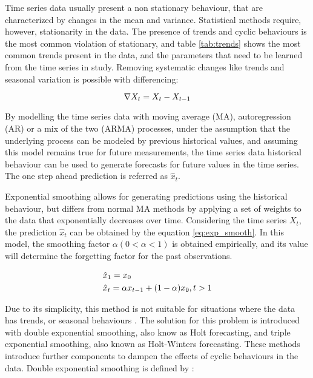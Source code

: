 \par Time series data usually present a non stationary behaviour, that are characterized by changes in the mean and variance. Statistical methods require, however, stationarity in the data. The presence of trends and cyclic behaviours
is the most common violation of stationary, and table \ref{tab:trends} shows the most common trends present in the data, and the parameters that need to be learned from the time series in study. Removing systematic changes like trends
and seasonal variation is possible with differencing:

\begin {equation*}
\centering
\nabla X_t = X_t - X_{t-1}
\end {equation*}

\par By modelling the time series data with moving average (MA), autoregression (AR) or a mix of the two (ARMA) processes, under the assumption that the underlying process can be modeled by previous historical values, and assuming
this model remains true for future measurements, the time series data historical behaviour can be used to generate forecasts for future values in the time series. The one step ahead prediction is referred as $\hat{x}_t$.

\par Exponential smoothing allows for generating predictions using the historical behaviour, but differs from normal MA methods by applying a set of weights to the data that exponentially decreases over time. Considering the time 
series $X_t$, the prediction $\hat{x}_t$ can be obtained by the equation \ref{eq:exp_smooth}. In this model, the smoothing factor $\alpha (0 < \alpha < 1)$ is obtained empirically, and its value will determine the forgetting factor
for the past observations.

\begin {equation*}
\centering
\begin {split}
&\hat{x}_1 = x_0 \\
&\hat{x}_t = \alpha x_{t-1} + (1-\alpha)x_0, t > 1
\end {split}
\label{eq:exp_smooth}
\end {equation*}

\par Due to its simplicity, this method is not suitable for situations where the data has trends, or seasonal behaviours \cite{CITE - http://labs.omniti.com/people/jesus/papers/holtwinters.pdf}. The solution for this problem is 
introduced with double exponential smoothing, also know as Holt forecasting, and triple exponential smoothing, also known as Holt-Winters forecasting. These methods introduce further components to dampen the effects of cyclic 
behaviours in the data. Double exponential smoothing is defined by \cite{CITE - https://www.net.in.tum.de/fileadmin/TUM/NET/NET-2010-06-1.pdf}:

